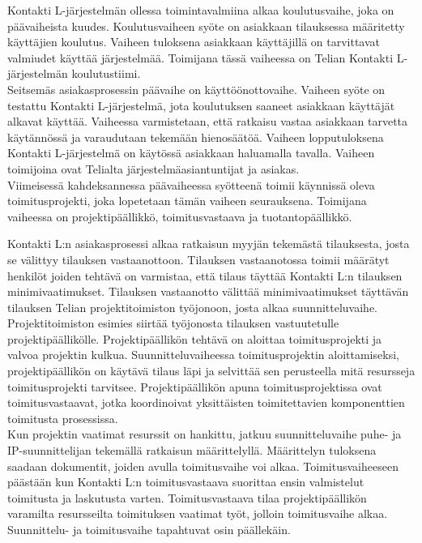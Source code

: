 \documentclass[finnish,12pt,a4paper,pdftex]{article}
\begin{document}
Kontakti L-järjestelmän ollessa toimintavalmiina alkaa koulutusvaihe, joka on päävaiheista kuudes. Koulutusvaiheen syöte on asiakkaan tilauksessa määritetty käyttäjien koulutus. Vaiheen tuloksena asiakkaan käyttäjillä on tarvittavat valmiudet käyttää järjestelmää. Toimijana tässä vaiheessa on Telian Kontakti L-järjestelmän koulutustiimi.\\

Seitsemäs asiakasprosessin päävaihe on käyttöönottovaihe. Vaiheen syöte on testattu Kontakti L-järjestelmä, jota koulutuksen saaneet asiakkaan käyttäjät alkavat käyttää. Vaiheessa varmistetaan, että ratkaisu vastaa asiakkaan tarvetta käytännössä ja varaudutaan tekemään hienosäätöä. Vaiheen lopputuloksena Kontakti L-järjestelmä on käytössä asiakkaan haluamalla tavalla. Vaiheen toimijoina ovat Telialta järjestelmäasiantuntijat ja asiakas.\\

Viimeisessä kahdeksannessa päävaiheessa syötteenä toimii käynnissä oleva toimitusprojekti, joka lopetetaan tämän vaiheen seurauksena. Toimijana vaiheessa on projektipäällikkö, toimitusvastaava ja tuotantopäällikkö.





Kontakti L:n asiakasprosessi alkaa ratkaisun myyjän tekemästä tilauksesta, josta se välittyy tilauksen vastaanottoon. Tilauksen vastaanotossa toimii määrätyt henkilöt joiden tehtävä on varmistaa, että tilaus täyttää Kontakti L:n tilauksen minimivaatimukset. Tilauksen vastaanotto välittää minimivaatimukset täyttävän tilauksen Telian projektitoimiston työjonoon, josta alkaa suunnitteluvaihe.\\

Projektitoimiston esimies siirtää työjonosta tilauksen vastuutetulle projektipäällikölle. Projektipäällikön tehtävä on aloittaa toimitusprojekti ja valvoa projektin kulkua. Suunnitteluvaiheessa toimitusprojektin aloittamiseksi, projektipäällikön on käytävä tilaus läpi ja selvittää sen perusteella mitä resursseja toimitusprojekti tarvitsee. Projektipäällikön apuna toimitusprojektissa ovat toimitusvastaavat, jotka koordinoivat yksittäisten toimitettavien komponenttien toimitusta prosessissa.\\

Kun projektin vaatimat resurssit on hankittu, jatkuu suunnitteluvaihe puhe- ja IP-suunnittelijan tekemällä ratkaisun määrittelyllä. Määrittelyn tuloksena saadaan dokumentit, joiden avulla toimitusvaihe voi alkaa. Toimitusvaiheeseen päästään kun Kontakti L:n toimitusvastaava suorittaa ensin valmistelut toimitusta ja laskutusta varten. Toimitusvastaava tilaa projektipäällikön varamilta resursseilta toimituksen vaatimat työt, jolloin toimitusvaihe alkaa. Suunnittelu- ja toimitusvaihe tapahtuvat osin päällekäin.\\
\end{document}
